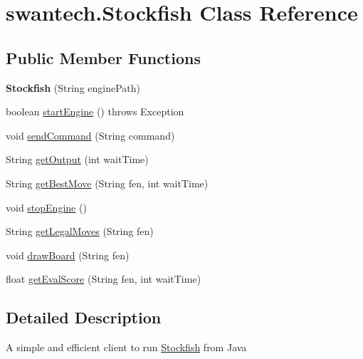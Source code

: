 \hypertarget{classswantech_1_1_stockfish}{}\section{swantech.\+Stockfish Class Reference}
\label{classswantech_1_1_stockfish}
\subsection*{Public Member Functions}
\begin{DoxyCompactItemize}
\item 
\hypertarget{classswantech_1_1_stockfish_a71a5472eb04f588e05418aec0bbbb167}{}{\bfseries Stockfish} (String engine\+Path)\label{classswantech_1_1_stockfish_a71a5472eb04f588e05418aec0bbbb167}

\item 
boolean \hyperlink{classswantech_1_1_stockfish_a19ab1ebc8d457f5743443bebe8ddd252}{start\+Engine} ()  throws Exception
\item 
void \hyperlink{classswantech_1_1_stockfish_a0b971d0f645065262487fb597347d74f}{send\+Command} (String command)
\item 
String \hyperlink{classswantech_1_1_stockfish_ae3766542f6513e9108d6e9ac0f6ea26b}{get\+Output} (int wait\+Time)
\item 
String \hyperlink{classswantech_1_1_stockfish_ab07795178cafa2c3f267ea274f4937be}{get\+Best\+Move} (String fen, int wait\+Time)
\item 
void \hyperlink{classswantech_1_1_stockfish_af97e469fd321bac056aed5251caa7284}{stop\+Engine} ()
\item 
String \hyperlink{classswantech_1_1_stockfish_a3e4c08a813a401dad9c0a8d98930beb0}{get\+Legal\+Moves} (String fen)
\item 
void \hyperlink{classswantech_1_1_stockfish_a15ce41395a20cc5be33df45b527de904}{draw\+Board} (String fen)
\item 
float \hyperlink{classswantech_1_1_stockfish_ad7bf5b45f2fe6b4d60827c734f509a65}{get\+Eval\+Score} (String fen, int wait\+Time)
\end{DoxyCompactItemize}


\subsection{Detailed Description}
A simple and efficient client to run \hyperlink{classswantech_1_1_stockfish}{Stockfish} from Java

